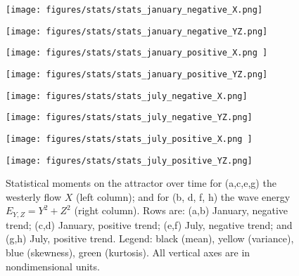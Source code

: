 \documentclass[%
 aip, cha,
 amsmath,amssymb,
 reprint,%
author-year,%
]{revtex4-1}
\newcommand{\0}{\mathbf 0}
\begin{document}
\clearpage


\begin{figure*}
	\begin{minipage}{0.45\textwidth}
		\centering
		\texttt{[image: figures/stats/stats\_january\_negative\_X.png]}
	\end{minipage}%
	\begin{minipage}{0.45\textwidth}
		\centering
		\texttt{[image: figures/stats/stats\_january\_negative\_YZ.png]}
	\end{minipage}
	
	\label{} 
	
\end{figure*}

\begin{figure*}
	\begin{minipage}{0.45\textwidth}
		\centering
		\texttt{[image: figures/stats/stats\_january\_positive\_X.png ]}
	\end{minipage}%
	\begin{minipage}{0.45\textwidth}
		\centering
		\texttt{[image: figures/stats/stats\_january\_positive\_YZ.png]}
	\end{minipage}
	
	\label{} 
	
\end{figure*}


\begin{figure*}
	\begin{minipage}{0.48\textwidth}
		\centering
		\texttt{[image: figures/stats/stats\_july\_negative\_X.png]}
	\end{minipage}%
	\begin{minipage}{0.48\textwidth}
		\centering
		\texttt{[image: figures/stats/stats\_july\_negative\_YZ.png]}
	\end{minipage}
	
	\label{} 
	
\end{figure*}

\begin{figure*}
	\begin{minipage}{0.48\textwidth}
		\centering
		\texttt{[image: figures/stats/stats\_july\_positive\_X.png ]}
	\end{minipage}%
	\begin{minipage}{0.48\textwidth}
		\centering
		\texttt{[image: figures/stats/stats\_july\_positive\_YZ.png]}
	\end{minipage}
	\caption{Statistical moments on the attractor over time for (a,c,e,g) the westerly flow $X$ (left column); and for (b, d, f, h) the wave energy $E_{Y, Z} = Y^2+Z^2$ (right column). Rows are: (a,b) January, negative trend; (c,d) January, positive trend; (e,f) July, negative trend; and (g,h) July, positive trend. Legend: black (mean), yellow (variance), blue (skewness), green (kurtosis). All vertical axes are in nondimensional units.}
	\label{fig:statistics} 
	
\end{figure*}
\end{document}
